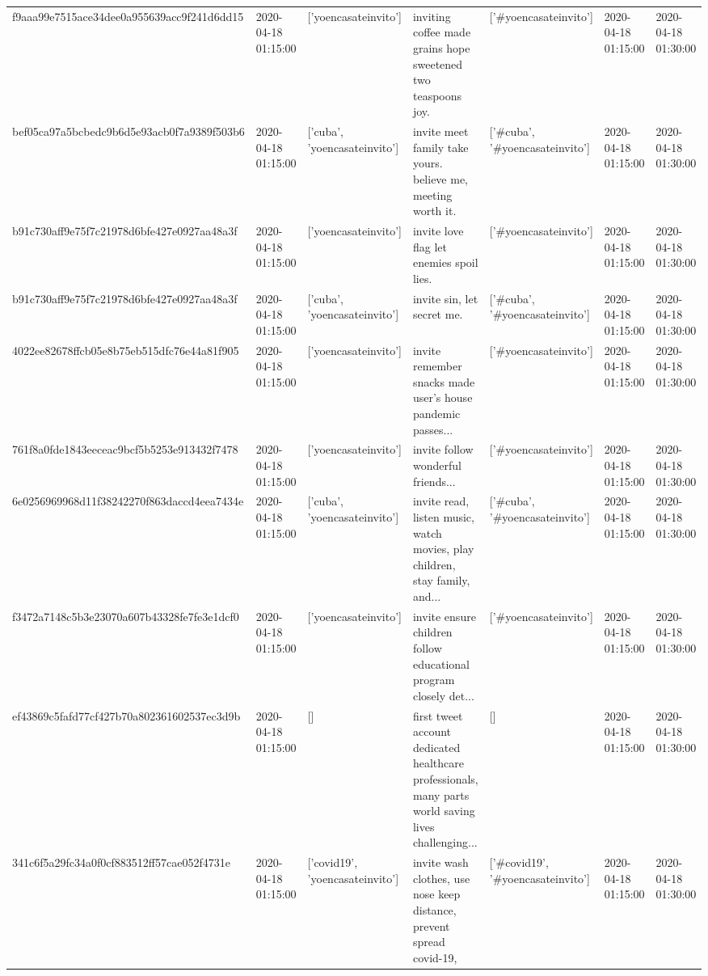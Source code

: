\begin{tabular}{lllllll}
f9aaa99e7515ace34dee0a955639acc9f241d6dd15 & 2020-04-18 01:15:00 & ['yoencasateinvito'] & inviting coffee made grains hope sweetened two teaspoons joy. & ['#yoencasateinvito'] & 2020-04-18 01:15:00 & 2020-04-18 01:30:00 \\
bef05ca97a5bcbedc9b6d5e93acb0f7a9389f503b6 & 2020-04-18 01:15:00 & ['cuba', 'yoencasateinvito'] & invite meet family take yours. believe me, meeting worth it. & ['#cuba', '#yoencasateinvito'] & 2020-04-18 01:15:00 & 2020-04-18 01:30:00 \\
b91c730aff9e75f7c21978d6bfe427e0927aa48a3f & 2020-04-18 01:15:00 & ['yoencasateinvito'] & invite love flag let enemies spoil lies. & ['#yoencasateinvito'] & 2020-04-18 01:15:00 & 2020-04-18 01:30:00 \\
b91c730aff9e75f7c21978d6bfe427e0927aa48a3f & 2020-04-18 01:15:00 & ['cuba', 'yoencasateinvito'] & invite sin, let secret me. & ['#cuba', '#yoencasateinvito'] & 2020-04-18 01:15:00 & 2020-04-18 01:30:00 \\
4022ee82678ffcb05e8b75eb515dfc76e44a81f905 & 2020-04-18 01:15:00 & ['yoencasateinvito'] & invite remember snacks made user's house pandemic passes... & ['#yoencasateinvito'] & 2020-04-18 01:15:00 & 2020-04-18 01:30:00 \\
761f8a0fde1843eeceac9bcf5b5253e913432f7478 & 2020-04-18 01:15:00 & ['yoencasateinvito'] & invite follow wonderful friends... & ['#yoencasateinvito'] & 2020-04-18 01:15:00 & 2020-04-18 01:30:00 \\
6e0256969968d11f38242270f863daccd4eea7434e & 2020-04-18 01:15:00 & ['cuba', 'yoencasateinvito'] & invite read, listen music, watch movies, play children, stay family, and... & ['#cuba', '#yoencasateinvito'] & 2020-04-18 01:15:00 & 2020-04-18 01:30:00 \\
f3472a7148c5b3e23070a607b43328fe7fe3e1dcf0 & 2020-04-18 01:15:00 & ['yoencasateinvito'] & invite ensure children follow educational program closely det... & ['#yoencasateinvito'] & 2020-04-18 01:15:00 & 2020-04-18 01:30:00 \\
ef43869c5fafd77cf427b70a802361602537ec3d9b & 2020-04-18 01:15:00 & [] & first tweet account dedicated healthcare professionals, many parts world saving lives challenging... & [] & 2020-04-18 01:15:00 & 2020-04-18 01:30:00 \\
341c6f5a29fc34a0f0cf883512ff57cae052f4731e & 2020-04-18 01:15:00 & ['covid19', 'yoencasateinvito'] & invite wash clothes, use nose keep distance, prevent spread covid-19, & ['#covid19', '#yoencasateinvito'] & 2020-04-18 01:15:00 & 2020-04-18 01:30:00 \\

\end{tabular}

